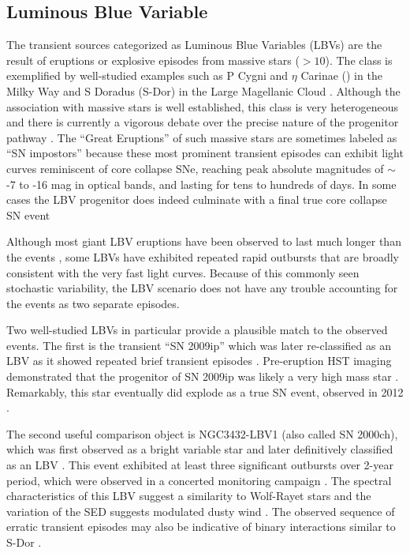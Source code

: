 \subsection{Luminous Blue Variable}

The transient sources categorized as Luminous Blue Variables (LBVs)
are the result of eruptions or explosive episodes from massive stars
($>10$\Msun).  The class is exemplified by well-studied examples such
as P Cygni and $\eta$ Carinae (\etacar) in the Milky Way and S Doradus
(S-Dor) in the Large Magellanic Cloud \citep[for recent overviews of
  the LBV class, see][]{Smith:2011b, Kochanek:2012}.  Although the
association with massive stars is well established, this class is very
heterogeneous and there is currently a vigorous debate over the
precise nature of the progenitor pathway
\citep{Smith:2015,Humphreys:2016,Smith:2016}.  The ``Great Eruptions''
of such massive stars are sometimes labeled as ``SN impostors''
because these most prominent transient episodes can exhibit light
curves reminiscent of core collapse SNe, reaching peak absolute
magnitudes of $\sim$-7 to -16 mag in optical bands, and lasting for
tens to hundreds of days.  In some cases the LBV progenitor does
indeed culminate with a final true core collapse SN event
\citep[e.g.]{Mauerhan:2013, Tartaglia:2016}

Although most giant LBV eruptions have been observed to last much
longer than the \spock events \citep{Smith:2011b}, some LBVs have
exhibited repeated rapid outbursts that are broadly consistent with
the very fast \spock light curves. Because of this commonly seen
stochastic variability, the LBV scenario does not have any trouble
accounting for the \spock events as two separate episodes.

Two well-studied LBVs in particular provide a plausible match to the
observed \spock events.  The first is the transient ``SN 2009ip''
\citep{Maza:2009} which was later re-classified as an LBV as it showed
repeated brief transient episodes \citep[e.g.,][]{Miller:2009,
  Li:2009, Berger:2009, Drake:2010}. Pre-eruption HST imaging
demonstrated that the progenitor of SN 2009ip was likely a very high
mass star \citep[$\gtrsim50$ \Msun,][]{Smith:2010, Foley:2011}.
Remarkably, this star eventually did explode as a true SN event,
observed in 2012 \citep{Mauerhan:2013, Pastorello:2013, Prieto:2013}.

The second useful comparison object is NGC3432-LBV1 (also called SN
2000ch), which was first observed as a bright variable star
\citep{Papenkova:2000} and later definitively classified as an LBV
\citep{Wagner:2004}.  This event exhibited at least three significant
outbursts over 2-year period, which were observed in a concerted
monitoring campaign \citep{Pastorello:2010}.  The spectral
characteristics of this LBV suggest a similarity to Wolf-Rayet stars
\citep{Pastorello:2010} and the variation of the SED suggests
modulated dusty wind \citep{Wagner:2004, Kochanek:2012}. The observed
sequence of erratic transient episodes may also be indicative of
binary interactions similar to S-Dor \citep{Pastorello:2010,
  Smith:2011b}.


